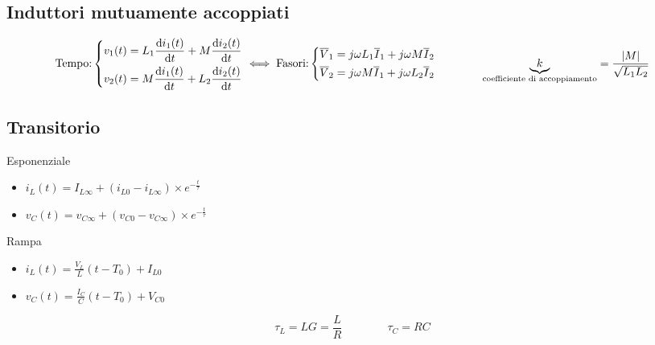 \documentclass[10pt]{article}
\begin{document}
    \vspace{-\baselineskip}
    \subsection*{Induttori mutuamente accoppiati}

        \[
            \text{Tempo:}
            \left\{
                \begin{aligned}
                    v_1 (t) &= L_1 \dv{i_1 (t)}{t} + M \dv{i_2 (t)}{t}\\
                    v_2 (t) &= M \dv{i_1 (t)}{t} + L_2 \dv{i_2 (t)}{t}
                \end{aligned}
            \right.
            \iff
            \text{Fasori:}
            \left\{
                \begin{aligned}
                    \overline{V}_1 &= j \omega L_1 \overline{I}_1 + j \omega M \overline{I}_2\\
                    \overline{V}_2 &= j \omega M \overline{I}_1 + j \omega L_2 \overline{I}_2
                \end{aligned}
            \right.
            \qquad\qquad
            \underbrace{k}_{\text{coefficiente di accoppiamento}} = \frac{\abs{M}}{\sqrt{L_1 L_2}}
        \]

    \vspace{-1.5\baselineskip}
    \subsection*{Transitorio}
    \vspace{-1.5\baselineskip}

        \begin{multicols}{3}
            
            Esponenziale
            \begin{itemize}
                \item \(i_L (t) = I_{L \infty} + (i_{L0} - i_{L\infty}) \times e^{-\frac{t}{\tau}}\)
                \item \(v_C (t) = v_{C \infty} + (v_{C 0} - v_{C \infty}) \times e^{-\frac{t}{\tau}}\)
            \end{itemize}

            \vfill\null
            \columnbreak

            Rampa
            \begin{itemize}
                \item \(i_L (t) = \frac{V_L}{L} (t - T_0) + I_{L0}\)
                \item \(v_C (t) = \frac{I_C}{C} (t - T_0) + V_{C0}\)
            \end{itemize}

            \vfill\null
            \columnbreak

            \[
                \tau_L = LG = \frac{L}{R}
                \qquad\qquad
                \tau_C = RC
            \]

        \end{multicols}
\end{document}
